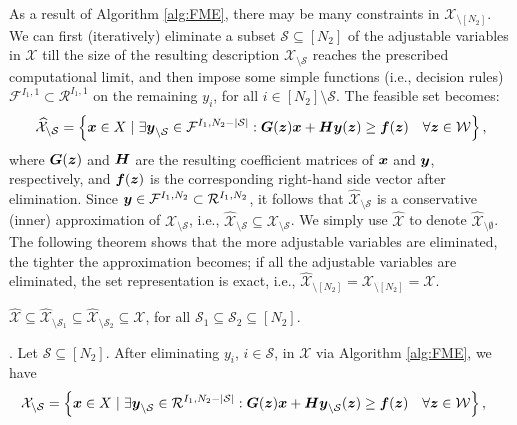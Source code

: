 \documentclass[fleqn,orsc,blindrev]{informs4}
\newcommand{\mb}[1]{\mbox{\boldmath \ensuremath{#1}}}
\begin{document}
	
	As a result of Algorithm \ref{alg:FME}, there may be many constraints in $\mathcal{X}_{\setminus [N_2]}$.  We can first (iteratively) eliminate a subset $\mathcal{S}\subseteq [N_2]$ of the adjustable variables in $\mathcal{X}$ till the size of the resulting description $\mathcal{X}_{\setminus \mathcal{S}}$ reaches the prescribed computational limit, and then impose some simple functions (i.e.,  decision rules)  $\mathcal{F}^{I_1,1} \subset \mathcal{R}^{I_1,1}$ on the remaining $y_i$, for all $i \in [N_2]\setminus \mathcal{S}$. The feasible set becomes:
\begin{equation*}
	\widehat{\mathcal{X}}_{\setminus \mathcal{S}} = \left\{ \mb{x} \in X \hspace{3pt} | \hspace{3pt} \exists  \mb{y}_{\setminus \mathcal{S}} \in \mathcal{F}^{I_1,N_2-|\mathcal{S}|}: \mb{G}(\mb{z})\mb{x}+\mb{H}\mb{y}(\mb{z}) \geq \mb{f}(\mb{z}) \quad \forall \mb{z} \in \mathcal{W} \right\},
\end{equation*}
	where $\mb{G}(\mb{z})$ and $\mb{H}$ are the resulting coefficient matrices of $\mb{x}$ and $\mb{y}$, respectively, and $\mb{f}(\mb{z})$ is the corresponding right-hand side vector after elimination. Since $\mb{y} \in \mathcal{F}^{I_1,N_2} \subset \mathcal{R}^{I_1,N_2}$, it follows that $\widehat{\mathcal{X}}_{\setminus \mathcal{S}} $ is a conservative (inner) approximation of $\mathcal{X}_{\setminus \mathcal{S}}$, i.e., $\widehat{\mathcal{X}}_{\setminus \mathcal{S}} \subseteq \mathcal{X}_{\setminus \mathcal{S}}$. We simply use $\widehat{\mathcal{X}}$ to denote $\widehat{\mathcal{X}}_{\setminus \emptyset}$. The following theorem shows that the more adjustable variables are eliminated, the tighter the approximation becomes; if all the adjustable variables are eliminated, the set representation is exact, i.e., $\widehat{\mathcal{X}}_{\setminus [N_2]} = \mathcal{X}_{\setminus [N_2]}= \mathcal{X}$. 
	\begin{theorem} \label{thm:subset}
		$\widehat{\mathcal{X}}\subseteq\widehat{\mathcal{X}}_{\setminus \mathcal{S}_1} \subseteq \widehat{\mathcal{X}}_{\setminus \mathcal{S}_2} \subseteq \mathcal{X}$, for all $\mathcal{S}_1 \subseteq \mathcal{S}_2 \subseteq [N_2]$.
	\end{theorem} 
	. Let $\mathcal{S} \subseteq [N_2]$. After eliminating $y_i$, $i \in \mathcal{S}$, in $\mathcal{X}$ via Algorithm \ref{alg:FME}, we have 
\begin{align*}
		\mathcal{X}_{\setminus \mathcal{S}} & = \left\{ \mb{x} \in X \hspace{3pt} | \hspace{3pt} \exists \mb{y}_{\setminus \mathcal{S}} \in \mathcal{R}^{I_1,N_2-|\mathcal{S}|}: \mb{G}(\mb{z})\mb{x}+\mb{H}\mb{y}_{\setminus \mathcal{S}}(\mb{z}) \geq \mb{f}(\mb{z})  \quad \forall \mb{z} \in \mathcal{W}  \right\},
\end{align*}
\end{document}
